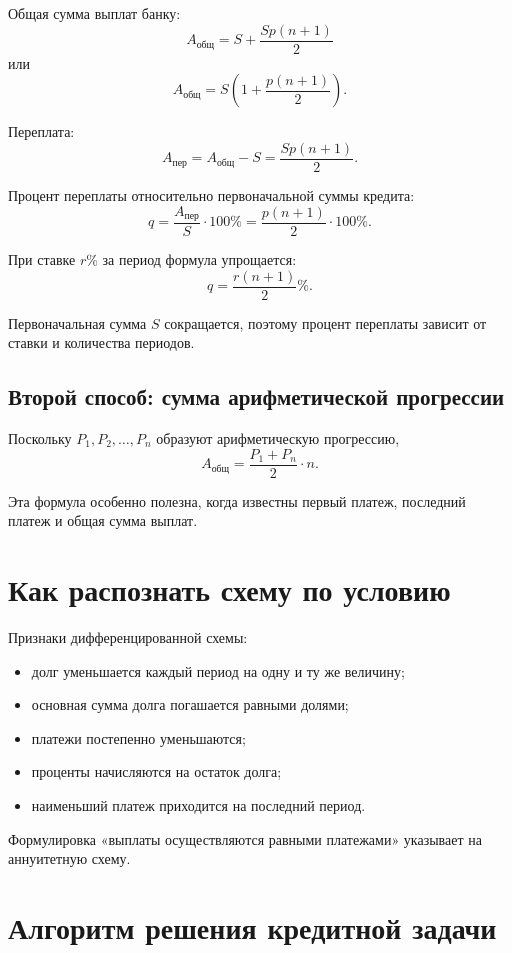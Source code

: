 \documentclass[a4paper,12pt]{article}
\newcommand{\Total}{A_{\text{общ}}}
\newcommand{\Over}{A_{\text{пер}}}
\begin{document}
Общая сумма выплат банку:
\[
\boxed{
\Total=S+\frac{Sp(n+1)}{2}
}
\]
или
\[
\boxed{
\Total=
S\left(1+\frac{p(n+1)}{2}\right)
}.
\]

Переплата:
\[
\boxed{
\Over=
\Total-S=
\frac{Sp(n+1)}{2}
}.
\]

Процент переплаты относительно первоначальной суммы кредита:
\[
\boxed{
q=
\frac{\Over}{S}\cdot100\%
=
\frac{p(n+1)}{2}\cdot100\%
}.
\]

При ставке $r\%$ за период формула упрощается:
\[
\boxed{
q=\frac{r(n+1)}{2}\%
}.
\]

Первоначальная сумма $S$ сокращается, поэтому процент переплаты зависит
от ставки и количества периодов.

\subsection{Второй способ: сумма арифметической прогрессии}

Поскольку $P_1,P_2,\ldots,P_n$ образуют арифметическую прогрессию,
\[
\Total=
\frac{P_1+P_n}{2}\cdot n.
\]

Эта формула особенно полезна, когда известны первый платеж, последний
платеж и общая сумма выплат.

\section{Как распознать схему по условию}

Признаки дифференцированной схемы:
\begin{itemize}[leftmargin=1.5em,itemsep=0.25em]
  \item долг уменьшается каждый период на одну и ту же величину;
  \item основная сумма долга погашается равными долями;
  \item платежи постепенно уменьшаются;
  \item проценты начисляются на остаток долга;
  \item наименьший платеж приходится на последний период.
\end{itemize}

Формулировка «выплаты осуществляются равными платежами» указывает
на аннуитетную схему.

\section{Алгоритм решения кредитной задачи}
\end{document}
